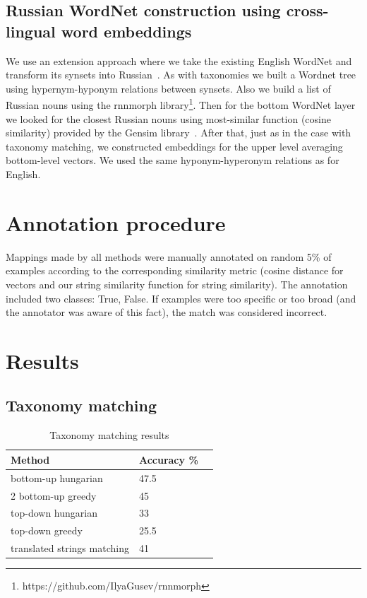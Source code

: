 \documentclass[11pt,a4paper]{article}
\begin{document}
\subsection{Russian WordNet construction using cross-lingual word embeddings}
We use an extension approach where we take the existing English WordNet and transform its synsets into Russian\ \cite{NEALE18.1030}. As with taxonomies we built a Wordnet tree using hypernym-hyponym relations between synsets. Also we build a list of Russian nouns using the rnnmorph library\footnote{https://github.com/IlyaGusev/rnnmorph}. Then for the bottom WordNet layer we looked for the closest Russian nouns using most-similar function (cosine similarity) provided by the Gensim library~\cite{gensim}. After that, just as in the case with taxonomy matching, we constructed embeddings for the upper level averaging bottom-level vectors. We used the same hyponym-hyperonym relations as for English.
\section{Annotation procedure}

Mappings made by all methods were manually annotated on random 5\% of examples according to the corresponding similarity metric (cosine distance for vectors and our string similarity function for string similarity). The annotation included two classes: True, False. If examples were too specific or too broad (and the annotator was aware of this fact), the match was considered incorrect.
\section{Results}

\subsection{Taxonomy matching}

	\begin{table}[!htbp]
	\small
	\caption{Taxonomy matching results}
	\label{table-taxonomies-results}		
	\centering
	\begin{tabular}{|l|l|l|}
	\hline
	{Method} & {Accuracy \%} \\ \hline
	bottom-up hungarian & 47.5 \\ \hline2
	bottom-up greedy & 45 \\ \hline
	top-down hungarian & 33 \\ \hline
	top-down greedy & 25.5 \\ \hline
	translated strings matching & 41 \\
	\hline
	\end{tabular}

\end{table}
\end{document}
